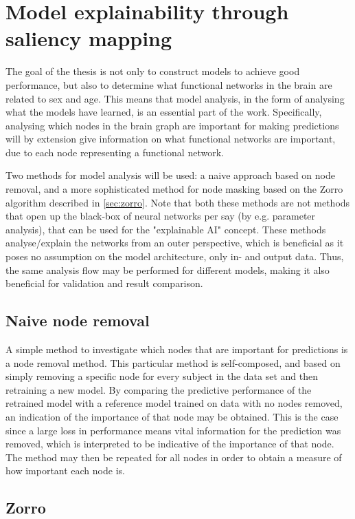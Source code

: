\section{Model explainability through saliency mapping}
The goal of the thesis is not only to construct models to achieve good performance, but also to determine what functional networks in the brain are related to sex and age. This means that model analysis, in the form of analysing what the models have learned, is an essential part of the work. Specifically, analysing which nodes in the brain graph are important for making predictions will by extension give information on what functional networks are important, due to each node representing a functional network. 

Two methods for model analysis will be used: a naive approach based on node removal, and a more sophisticated method for node masking based on the Zorro algorithm described in \cref{sec:zorro}. Note that both these methods are not methods that open up the black-box of neural networks per say (by e.g. parameter analysis), that can be used for the "explainable AI" concept.  These methods analyse/explain the networks from an outer perspective, which is beneficial as it poses no assumption on the model architecture, only in- and output data. Thus, the same analysis flow may be performed for different models, making it also beneficial for validation and result comparison. 

\subsection{Naive node removal}
A simple method to investigate which nodes that are important for predictions is a node removal method. This particular method is self-composed, and based on simply removing a specific node for every subject in the data set and then retraining a new model. By comparing the predictive performance of the retrained model with a reference model trained on data with no nodes removed, an indication of the importance of that node may be obtained. This is the case since a large loss in performance means vital information for the prediction was removed, which is interpreted to be indicative of the importance of that node. The method may then be repeated for all nodes in order to obtain a measure of how important each node is.

\subsection{Zorro}


